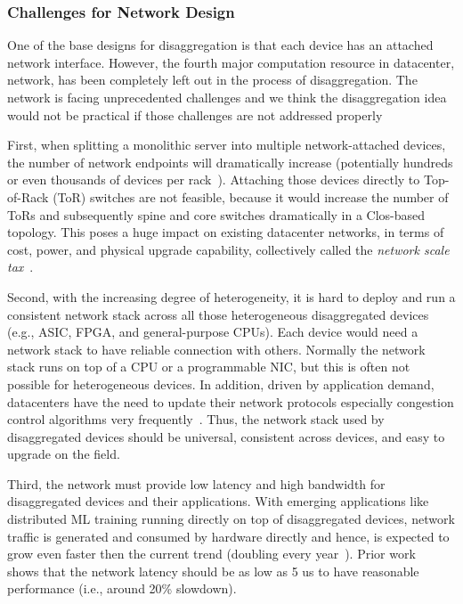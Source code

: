 \subsubsection{Challenges for Network Design}

One of the base designs for disaggregation is that each device has an attached network interface.
However, the fourth major computation resource in datacenter, network, has been completely left out in the process of disaggregation.
The network is facing unprecedented challenges and we think
the disaggregation idea would not be practical if those challenges are not addressed properly

First, when splitting a monolithic server into multiple network-attached
devices, the number of network endpoints will dramatically increase
(potentially hundreds or even thousands of devices per rack~\cite{shoal-nsdi19}).
Attaching those devices directly to Top-of-Rack (ToR) switches are not feasible,
because it would increase the number of ToRs and subsequently spine and core switches dramatically in a Clos-based topology.
This poses a huge impact on existing datacenter networks, in terms of cost, power, and physical upgrade capability,
collectively called the \textit{network scale tax}~\cite{sirius-sigcomm20}.

Second, with the increasing degree of heterogeneity,
it is hard to deploy and run a consistent network stack across all those
heterogeneous disaggregated devices (e.g., ASIC, FPGA, and general-purpose CPUs).
Each device would need a network stack to have reliable connection with others.
Normally the network stack runs on top of a CPU or a programmable NIC,
but this is often not possible for heterogeneous devices.
In addition, driven by application demand, datacenters have the need to update their network
protocols especially congestion control algorithms very frequently~\cite{swift-sigcomm20}.
Thus, the network stack used by disaggregated devices should be universal, consistent
across devices, and easy to upgrade on the field.

Third, the network must provide low latency and high bandwidth for disaggregated devices and their applications.
With emerging applications like distributed ML training running directly on top of disaggregated devices,
network traffic is generated and consumed by hardware directly and hence, is expected
to grow even faster then the current trend (doubling every year~\cite{sirius-sigcomm20}).
Prior work~\cite{legoOS} shows that the network latency should be as low as 5 us to have reasonable performance (i.e., around 20\% slowdown).

